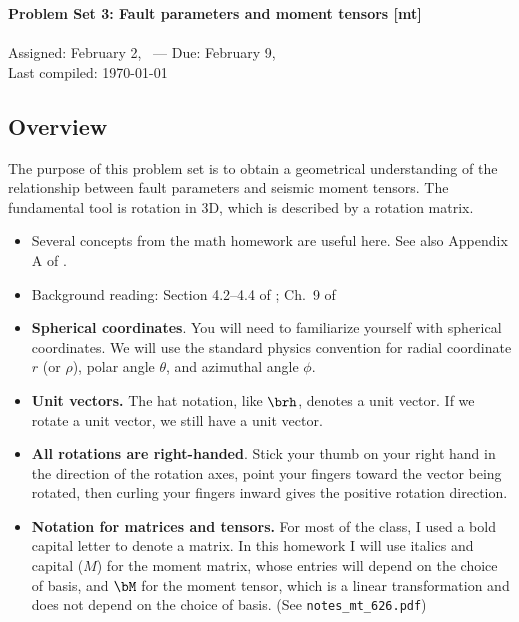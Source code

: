 \documentclass[11pt,titlepage,fleqn]{article}
\begin{document}

\begin{spacing}{1.2}
\centering
{\large \bf Problem Set 3: Fault parameters and moment tensors [mt]} \\
\cltag\ \\
Assigned: February 2, \cyear\ --- Due: February 9, \cyear\ \\
Last compiled: \today
\end{spacing}

\begin{spacing}{1.0}

\subsection*{Overview}

The purpose of this problem set is to obtain a geometrical understanding of the relationship between fault parameters and seismic moment tensors. The fundamental tool is rotation in 3D, which is described by a rotation matrix.

\begin{itemize}
\item Several concepts from the math homework are useful here. See also Appendix A of \citet{SteinWysession}.

\item Background reading: Section 4.2--4.4 of \citet{SteinWysession}; Ch.~9 of \citet{ShearerE2}

\item {\bf Spherical coordinates}. You will need to familiarize yourself with spherical coordinates. We will use the standard physics convention for radial coordinate $r$ (or $\rho$), polar angle $\theta$, and azimuthal angle $\phi$.

\item {\bf Unit vectors.} The hat notation, like $\brh$, denotes a unit vector. If we rotate a unit vector, we still have a unit vector.

\item {\bf All rotations are right-handed}. Stick your thumb on your right hand in the direction of the rotation axes, point your fingers toward the vector being rotated, then curling your fingers inward gives the positive rotation direction.

\item {\bf Notation for matrices and tensors.} For most of the class, I used a bold capital letter to denote a matrix. In this homework I will use italics and capital ($M$) for the moment matrix, whose entries will depend on the choice of basis, and $\bM$ for the moment tensor, which is a linear transformation and does not depend on the choice of basis. (See \verb+notes_mt_626.pdf+)


\end{itemize}
\end{spacing}
\end{document}
